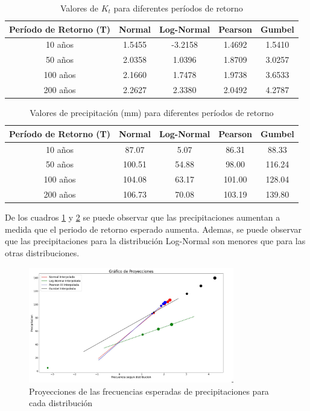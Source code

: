 \documentclass{article}  %
\begin{document}
\begin{table}[H]
  \centering
  \caption{Valores de \( K_t \) para diferentes períodos de retorno}
  \begin{tabular}{|c|c|c|c|c|}
  \hline
  \textbf{Período de Retorno (T)} & \textbf{Normal} & \textbf{Log-Normal} & \textbf{Pearson} & \textbf{Gumbel} \\ \hline
  10 años  & 1.5455 & -3.2158 & 1.4692 & 1.5410 \\ \hline
  50 años  & 2.0358 & 1.0396 & 1.8709 & 3.0257 \\ \hline
  100 años & 2.1660 & 1.7478 & 1.9738 & 3.6533 \\ \hline
  200 años & 2.2627 & 2.3380 & 2.0492 & 4.2787 \\ \hline
  \end{tabular}
  \label{table:kt}
\end{table}

\begin{table}[H]
  \centering
  \caption{Valores de precipitación (mm) para diferentes períodos de retorno}
  \begin{tabular}{|c|c|c|c|c|}
  \hline
  \textbf{Período de Retorno (T)} & \textbf{Normal} & \textbf{Log-Normal} & \textbf{Pearson} & \textbf{Gumbel} \\ \hline
  10 años  & 87.07 & 5.07 & 86.31 & 88.33 \\ \hline
  50 años  & 100.51 & 54.88 & 98.00 & 116.24 \\ \hline
  100 años & 104.08 & 63.17 & 101.00 & 128.04 \\ \hline
  200 años & 106.73 & 70.08 & 103.19 & 139.80 \\ \hline
  \end{tabular}
  \label{table:precipitacion}
\end{table}

De los cuadros \ref{table:kt} y \ref{table:precipitacion} se puede observar que las precipitaciones aumentan a medida que el periodo de retorno esperado aumenta. Ademas, se puede observar que las precipitaciones para la distribución Log-Normal son menores que para las otras distribuciones.

\begin{figure}[H]
  \centering
  \includegraphics[width=0.8\textwidth]{grafico_proyecciones.jpg}
  \caption{Proyecciones de las frecuencias esperadas de precipitaciones para cada distribución}
  \label{fig:grafico_proyecciones}
\end{figure}
\end{document}
